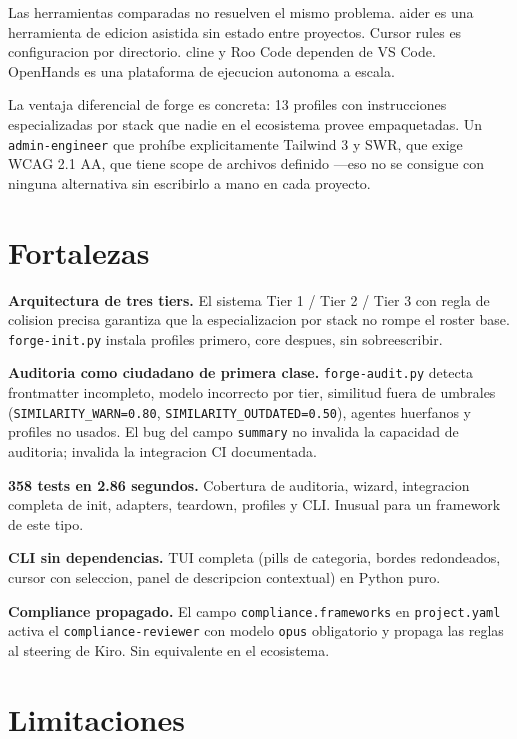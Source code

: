 \documentclass[12pt,a4paper]{article}
\begin{document}
Las herramientas comparadas no resuelven el mismo problema. aider es una herramienta
de edicion asistida sin estado entre proyectos. Cursor rules es configuracion por
directorio. cline y Roo Code dependen de VS Code. OpenHands es una plataforma de
ejecucion autonoma a escala.

La ventaja diferencial de forge es concreta: 13 profiles con instrucciones especializadas
por stack que nadie en el ecosistema provee empaquetadas. Un \texttt{admin-engineer}
que prohíbe explicitamente Tailwind 3 y SWR, que exige WCAG 2.1 AA, que tiene scope
de archivos definido ---eso no se consigue con ninguna alternativa sin escribirlo a
mano en cada proyecto.

\section{Fortalezas}

\textbf{Arquitectura de tres tiers.} El sistema Tier 1 / Tier 2 / Tier 3 con regla
de colision precisa garantiza que la especializacion por stack no rompe el roster base.
\texttt{forge-init.py} instala profiles primero, core despues, sin sobreescribir.

\textbf{Auditoria como ciudadano de primera clase.} \texttt{forge-audit.py} detecta
frontmatter incompleto, modelo incorrecto por tier, similitud fuera de umbrales
(\texttt{SIMILARITY\_WARN=0.80}, \texttt{SIMILARITY\_OUTDATED=0.50}), agentes huerfanos
y profiles no usados. El bug del campo \texttt{summary} no invalida la capacidad de
auditoria; invalida la integracion CI documentada.

\textbf{358 tests en 2.86 segundos.} Cobertura de auditoria, wizard, integracion
completa de init, adapters, teardown, profiles y CLI. Inusual para un framework de
este tipo.

\textbf{CLI sin dependencias.} TUI completa (pills de categoria, bordes redondeados,
cursor con seleccion, panel de descripcion contextual) en Python puro.

\textbf{Compliance propagado.} El campo \texttt{compliance.frameworks} en
\texttt{project.yaml} activa el \texttt{compliance-reviewer} con modelo \texttt{opus}
obligatorio y propaga las reglas al steering de Kiro. Sin equivalente en el ecosistema.

\section{Limitaciones}
\end{document}
